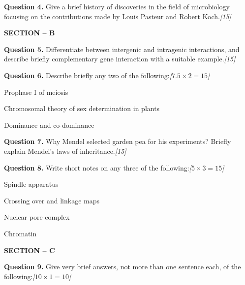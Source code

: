 \documentclass[11pt,a4paper]{article}
\newcommand{\pts}[1]{\hfill   \textit{[#1]}}
\begin{document}
\medskip


\noindent   \textbf{Question 4.} Give a brief history of discoveries in the field of microbiology focusing on the contributions made by Louis Pasteur and Robert Koch.\pts{15}

\bigskip

\begin{center}
   \textbf{SECTION -- B}
\end{center}
\medskip

\medskip


\noindent   \textbf{Question 5.} Differentiate between intergenic and intragenic interactions, and describe briefly complementary gene interaction with a suitable example.\pts{15}

\medskip


\noindent   \textbf{Question 6.} Describe briefly any two of the following:\pts{$7.5  \times 2 = 15$}

\begin{parts}
  \item Prophase I of meiosis
  \item Chromosomal theory of sex determination in plants
  \item Dominance and co-dominance
\end{parts}

\medskip


\noindent   \textbf{Question 7.} Why Mendel selected garden pea for his experiments? Briefly explain Mendel's laws of inheritance.\pts{15}

\medskip


\noindent   \textbf{Question 8.} Write short notes on any three of the following:\pts{$5  \times 3 = 15$}

\begin{parts}
  \item Spindle apparatus
  \item Crossing over and linkage maps
  \item Nuclear pore complex
  \item Chromatin
\end{parts}

\bigskip

\begin{center}
   \textbf{SECTION -- C}
\end{center}
\medskip

\medskip


\noindent   \textbf{Question 9.} Give very brief answers, not more than one sentence each, of the following:\pts{$10  \times 1 = 10$}
\end{document}
